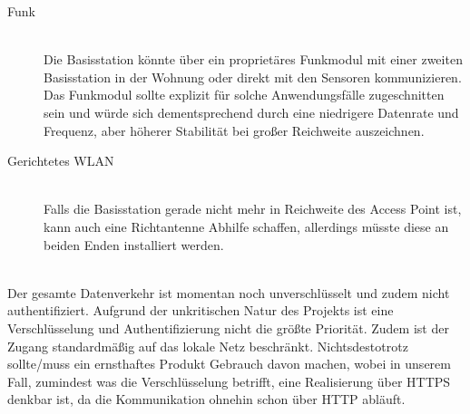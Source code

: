 \begin{description}
		\begin{description}
			\item [Funk]  \hfill \\
				Die Basisstation könnte über ein proprietäres Funkmodul mit einer zweiten Basisstation in der Wohnung oder direkt mit den Sensoren kommunizieren. Das Funkmodul sollte explizit für solche Anwendungsfälle zugeschnitten sein und würde sich dementsprechend durch eine niedrigere Datenrate und Frequenz, aber höherer Stabilität bei großer Reichweite auszeichnen. 
			\item [Gerichtetes WLAN] \hfill \\
				Falls die Basisstation gerade nicht mehr in Reichweite des Access Point ist, kann auch eine Richtantenne Abhilfe schaffen, allerdings müsste diese an beiden Enden installiert werden.
		\end{description}
	\item [Verschlüsselung] \hfill \\
		Der gesamte Datenverkehr ist momentan noch unverschlüsselt und zudem nicht authentifiziert. Aufgrund der unkritischen Natur des Projekts ist eine Verschlüsselung und Authentifizierung nicht die größte Priorität. Zudem ist der Zugang standardmäßig auf das lokale Netz beschränkt. Nichtsdestotrotz sollte/muss ein ernsthaftes Produkt Gebrauch davon machen, wobei in unserem Fall, zumindest was die Verschlüsselung betrifft, eine Realisierung über HTTPS denkbar ist, da die Kommunikation ohnehin schon über HTTP abläuft.
	\item
\end{description}

